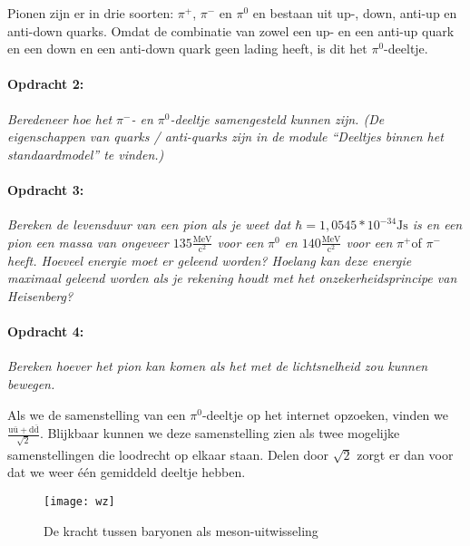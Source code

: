 Pionen zijn er in drie soorten: $\pi^{+}$, $\pi^{-}$ en $\pi^{0}$
en bestaan uit up-, down, anti-up en anti-down quarks. Omdat de combinatie
van zowel een up- en een anti-up quark en een down en een anti-down
quark geen lading heeft, is dit het $\pi^{0}$-deeltje.


\paragraph*{Opdracht 2:}

\emph{Beredeneer hoe het $\pi^{-}$- en $\pi^{0}$-deeltje samengesteld
kunnen zijn. (De eigenschappen van quarks / anti-quarks zijn in de
module ``Deeltjes binnen het standaardmodel'' te vinden.) }


\paragraph*{Opdracht 3:}

\emph{Bereken de levensduur van een pion als je weet dat $\hbar=1,0545*10^{-34}\mathrm{Js}$
is en een pion een massa van ongeveer $135\mathrm{\frac{MeV}{c^{2}}}$
voor een }$\pi^{0}$\emph{ en $140\mathrm{\frac{MeV}{c^{2}}}$ voor
een }$\pi^{+}$of $\pi^{-}$\emph{ heeft. Hoeveel energie moet er
geleend worden? Hoelang kan deze energie maximaal geleend worden als
je rekening houdt met het onzekerheidsprincipe van Heisenberg?}


\paragraph*{Opdracht 4:}

\emph{Bereken hoever het pion kan komen als het met de lichtsnelheid
zou kunnen bewegen.}

Als we de samenstelling van een $\pi^{0}$-deeltje op het internet
opzoeken, vinden we $\frac{\mathrm{u\bar{u}+d\bar{d}}}{\sqrt{2}}$.
Blijkbaar kunnen we deze samenstelling zien als twee mogelijke samenstellingen
die loodrecht op elkaar staan. Delen door $\sqrt{2}$ zorgt er dan
voor dat we weer één gemiddeld deeltje hebben.

\begin{figure}[h]
\noindent \begin{centering}
\texttt{[image: wz]}
\par\end{centering}

\caption{De kracht tussen baryonen als meson-uitwisseling}
\end{figure}



